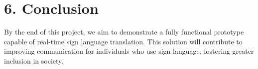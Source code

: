 \documentclass{article}
\begin{document}
\section*{6. Conclusion} 
By the end of this project, we aim to demonstrate a fully functional prototype capable of real-time sign language translation. This solution will contribute to improving communication for individuals who use sign language, fostering greater inclusion in society.
\end{document}
